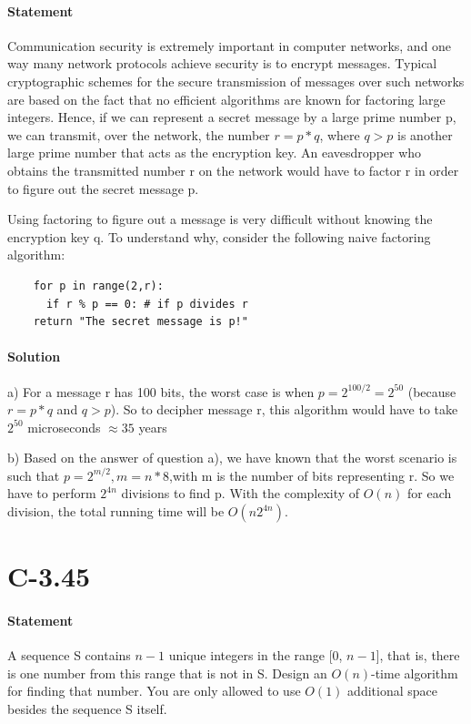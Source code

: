 \documentclass{article}
\begin{document}
  \paragraph{Statement}
  Communication security is extremely important in computer networks, and one way many network protocols achieve security is to encrypt messages. Typical cryptographic schemes for the secure transmission of messages over such networks are based on the fact that no efficient algorithms are known for factoring large integers. Hence, if we can represent a secret message by a large prime number p, we can transmit, over the network, the number $r = p*q$, where $q > p$ is another large prime number that acts as the encryption key. An eavesdropper who obtains the transmitted number r on the network would have to factor r in order to figure out the secret message p. \par Using factoring to figure out a message is very difficult without knowing the encryption key q. To understand why, consider the following naive
factoring algorithm:
  \begin{lstlisting}
    for p in range(2,r):
      if r % p == 0: # if p divides r
    return "The secret message is p!"
  \end{lstlisting}
  \paragraph{Solution}
  a) For a message r has 100 bits, the worst case is when $p=2^{100/2} = 2^{50}$ (because $r = p*q$ and $q>p$). So to decipher message r, this algorithm would have to take $2^{50}$ microseconds $\approx 35$ years  \par
  b) Based on the answer of question a), we have known that the worst scenario is such that $p=2^{m/2}, m=n*8$,with m is the number of bits representing r. So we have to perform $2^{4n}$ divisions to find p. With the complexity of $O(n)$ for each division, the total running time will be $O(n2^{4n})$.
\section{C-3.45}
  \paragraph{Statement}
  A sequence S contains $n-1$ unique integers in the range [0, $n-1$], that is, there is one number from this range that is not in S. Design an $O(n)$-time algorithm for finding that number. You are only allowed to use $O(1)$ additional space besides the sequence S itself.
\end{document}
